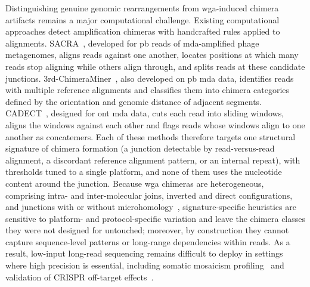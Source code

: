 \documentclass[pdflatex,lineno]{sn-jnl}%
\newif\ifrevisedtext
\newcommand{\chg}[1]{\ifrevisedtext\textcolor{revcolor}{#1}\else#1\fi}
\begin{document}
Distinguishing genuine genomic rearrangements from \gls{wga}-induced chimera artifacts remains a major computational challenge.
\chg{Existing computational approaches detect amplification chimeras with handcrafted rules applied to alignments.
	SACRA~\cite{kiguchi2021longread}, developed for \gls{pb} reads of \gls{mda}-amplified phage metagenomes, aligns reads against one another, locates positions at which many reads stop aligning while others align through, and splits reads at these candidate junctions.
	3rd-ChimeraMiner~\cite{lu2023exploration}, also developed on \gls{pb} \gls{mda} data, identifies reads with multiple reference alignments and classifies them into chimera categories defined by the orientation and genomic distance of adjacent segments.
	CADECT~\cite{agyabeng2025evaluating}, designed for \gls{ont} \gls{mda} data, cuts each read into sliding windows, aligns the windows against each other and flags reads whose windows align to one another as concatemers.
	Each of these methods therefore targets one structural signature of chimera formation (a junction detectable by read-versus-read alignment, a discordant reference alignment pattern, or an internal repeat), with thresholds tuned to a single platform, and none of them uses the nucleotide content around the junction.
	Because \gls{wga} chimeras are heterogeneous, comprising intra- and inter-molecular joins, inverted and direct configurations, and junctions with or without microhomology~\cite{lasken2007mechanism,lu2023chimera}, signature-specific heuristics are sensitive to platform- and protocol-specific variation and leave the chimera classes they were not designed for untouched; moreover, by construction they cannot capture sequence-level patterns or long-range dependencies within reads.}
As a result, low-input long-read sequencing remains difficult to deploy in settings where high precision is essential, including somatic mosaicism profiling~\cite{haComprehensiveBenchmarkingGuidelines2023} and validation of CRISPR off-target effects~\cite{hoijerAmplificationfreeLongreadSequencing2020}.
\end{document}
